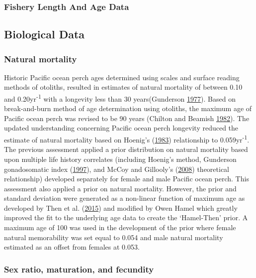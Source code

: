 \documentclass[12pt,]{article}
\begin{document}
\subsubsection{Fishery Length And Age
Data}\label{fishery-length-and-age-data}

\subsection{Biological Data}\label{biological-data}

\subsubsection{Natural mortality}\label{natural-mortality}

Historic Pacific ocean perch ages determined using scales and surface
reading methods of otoliths, resulted in estimates of natural mortality
of between 0.10 and 0.20yr\textsuperscript{-1} with a longevity less
than 30 years(Gunderson
\protect\hyperlink{ref-gunderson_population_1977}{1977}). Based on
break-and-burn method of age determination using otoliths, the maximum
age of Pacific ocean perch was revised to be 90 years (Chilton and
Beamish \protect\hyperlink{ref-chilton_age_1982}{1982}). The updated
understanding concerning Pacific ocean perch longevity reduced the
estimate of natural mortality based on Hoenig's
(\protect\hyperlink{ref-hoenig_empirical_1983}{1983}) relationship to
0.059yr\textsuperscript{-1}. The previous assessment applied a prior
distribution on natural mortality based upon multiple life history
correlates (including Hoenig's method, Gunderson gonadosomatic index
(\protect\hyperlink{ref-gunderson_trade-off_1997}{1997}), and McCoy and
Gillooly's (\protect\hyperlink{ref-mccoy_predicting_2008}{2008})
theoretical relationship) developed separately for female and male
Pacific ocean perch. This assessment also applied a prior on natural
mortality. However, the prior and standard deviation were generated as a
non-linear function of maximum age as developed by Then et al.
(\protect\hyperlink{ref-then_evaluating_2015}{2015}) and modified by
Owen Hamel which greatly improved the fit to the underlying age data to
create the `Hamel-Then' prior. A maximum age of 100 was used in the
development of the prior where female natural memorability was set equal
to 0.054 and male natural mortality estimated as an offset from females
at 0.053.

\subsubsection{Sex ratio, maturation, and
fecundity}\label{sex-ratio-maturation-and-fecundity}
\end{document}
